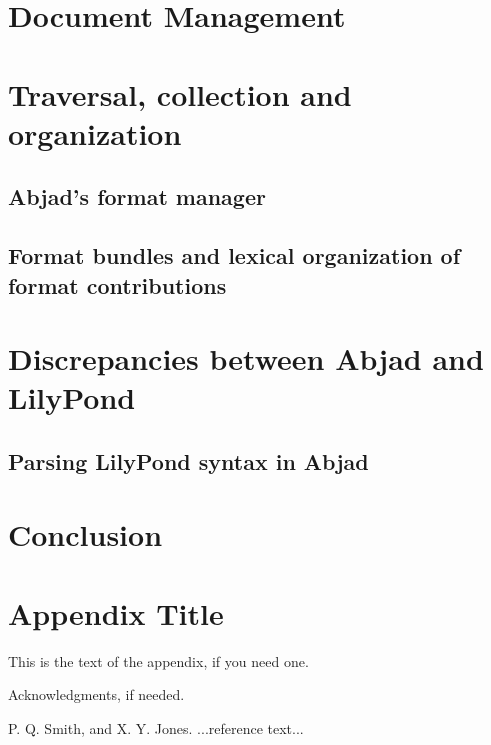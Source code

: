 \documentclass{sigplanconf}
\begin{document}
\section{Document Management}

\section{Traversal, collection and organization}

\subsection{Abjad's format manager}

\subsection{Format bundles and lexical organization of format contributions}

\section{Discrepancies between Abjad and LilyPond}

\subsection{Parsing LilyPond syntax in Abjad}

\section{Conclusion}

\appendix
\section{Appendix Title}

This is the text of the appendix, if you need one.

\acks

Acknowledgments, if needed.





\begin{thebibliography}{}
\softraggedright

P. Q. Smith, and X. Y. Jones. ...reference text...

\end{thebibliography}
\end{document}
